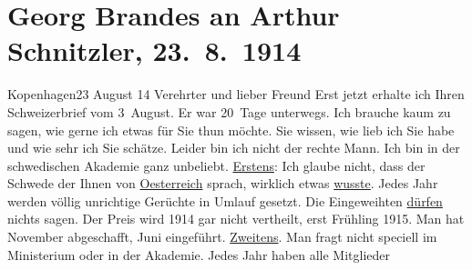                \section[Georg Brandes an Arthur Schnitzler, 23. 8. 1914]{ Georg Brandes an Arthur Schnitzler, 23. 8. 1914}\nopagebreak{}\rehead{ }\begin{ledgroupsized}[t]{13cm}\normalsize\beginnumbering \toendnotes[C]{\smallbreak\pagebreak[2]} 
\toendnotes[C]{\smallbreak}\pstart
           \raggedleft{}{\pb}Kopenhagen23 August 14\pend
           \pstart{}Verehrter und lieber Freund\pend\pstart
           Erst jetzt erhalte ich Ihren Schweizerbrief
                    vom 3 August. Er war 20 Tage unterwegs.\pend
           \pstart
           Ich brauche kaum zu sagen, wie gerne ich etwas für Sie thun möchte. Sie wissen,
                    wie lieb ich Sie habe und wie sehr ich Sie schätze.\pend
           \pstart
           Leider bin ich nicht der rechte Mann. Ich bin in der schwedischen Akademie ganz unbeliebt.\pend
           \pstart
           \uline{Erstens}: Ich glaube nicht, dass
                    der Schwede der Ihnen von
                        \uline{Oesterreich} sprach, wirklich etwas \uline{wusste}. Jedes Jahr
                    werden völlig unrichtige Gerüchte in Umlauf gesetzt. Die Eingeweihten \uline{dürfen} nichts sagen. Der Preis wird 1914
                    gar nicht vertheilt, erst Frühling 1915. Man hat November
                    abgeschafft, Juni eingeführt.\pend
           \pstart
           {\pb}\uline{Zweitens}. Man fragt nicht speciell im Ministerium oder in der Akademie. Jedes Jahr haben alle Mitglieder

\end{ledgroupsized}
